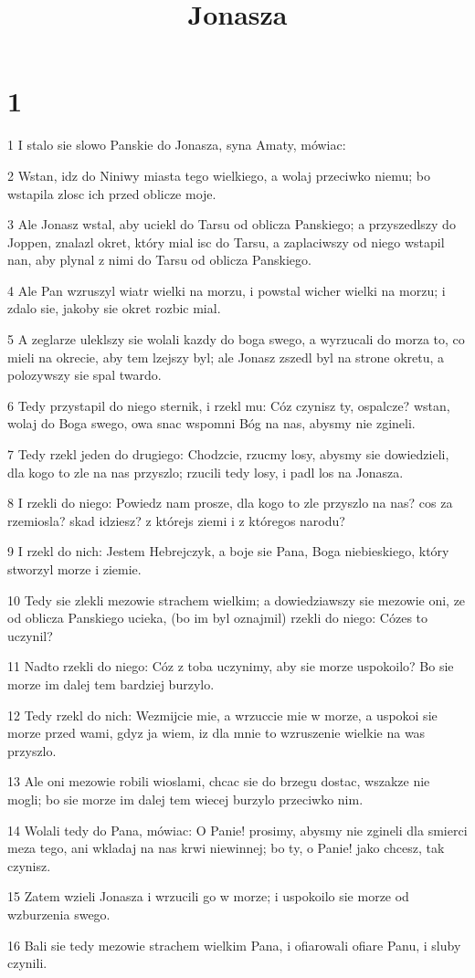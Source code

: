 

\title{Jonasza}


\chapter{1}

\par 1 I stalo sie slowo Panskie do Jonasza, syna Amaty, mówiac:
\par 2 Wstan, idz do Niniwy miasta tego wielkiego, a wolaj przeciwko niemu; bo wstapila zlosc ich przed oblicze moje.
\par 3 Ale Jonasz wstal, aby uciekl do Tarsu od oblicza Panskiego; a przyszedlszy do Joppen, znalazl okret, który mial isc do Tarsu, a zaplaciwszy od niego wstapil nan, aby plynal z nimi do Tarsu od oblicza Panskiego.
\par 4 Ale Pan wzruszyl wiatr wielki na morzu, i powstal wicher wielki na morzu; i zdalo sie, jakoby sie okret rozbic mial.
\par 5 A zeglarze uleklszy sie wolali kazdy do boga swego, a wyrzucali do morza to, co mieli na okrecie, aby tem lzejszy byl; ale Jonasz zszedl byl na strone okretu, a polozywszy sie spal twardo.
\par 6 Tedy przystapil do niego sternik, i rzekl mu: Cóz czynisz ty, ospalcze? wstan, wolaj do Boga swego, owa snac wspomni Bóg na nas, abysmy nie zgineli.
\par 7 Tedy rzekl jeden do drugiego: Chodzcie, rzucmy losy, abysmy sie dowiedzieli, dla kogo to zle na nas przyszlo; rzucili tedy losy, i padl los na Jonasza.
\par 8 I rzekli do niego: Powiedz nam prosze, dla kogo to zle przyszlo na nas? cos za rzemiosla? skad idziesz? z którejs ziemi i z któregos narodu?
\par 9 I rzekl do nich: Jestem Hebrejczyk, a boje sie Pana, Boga niebieskiego, który stworzyl morze i ziemie.
\par 10 Tedy sie zlekli mezowie strachem wielkim; a dowiedziawszy sie mezowie oni, ze od oblicza Panskiego ucieka, (bo im byl oznajmil) rzekli do niego: Cózes to uczynil?
\par 11 Nadto rzekli do niego: Cóz z toba uczynimy, aby sie morze uspokoilo? Bo sie morze im dalej tem bardziej burzylo.
\par 12 Tedy rzekl do nich: Wezmijcie mie, a wrzuccie mie w morze, a uspokoi sie morze przed wami, gdyz ja wiem, iz dla mnie to wzruszenie wielkie na was przyszlo.
\par 13 Ale oni mezowie robili wioslami, chcac sie do brzegu dostac, wszakze nie mogli; bo sie morze im dalej tem wiecej burzylo przeciwko nim.
\par 14 Wolali tedy do Pana, mówiac: O Panie! prosimy, abysmy nie zgineli dla smierci meza tego, ani wkladaj na nas krwi niewinnej; bo ty, o Panie! jako chcesz, tak czynisz.
\par 15 Zatem wzieli Jonasza i wrzucili go w morze; i uspokoilo sie morze od wzburzenia swego.
\par 16 Bali sie tedy mezowie strachem wielkim Pana, i ofiarowali ofiare Panu, i sluby czynili.


